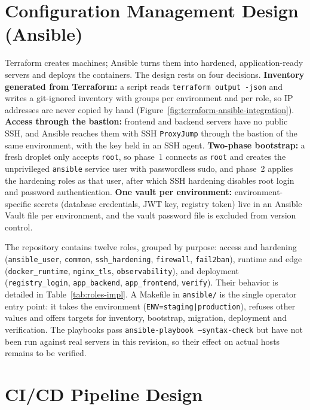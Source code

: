 \section{Configuration Management Design (Ansible)}

Terraform creates machines; Ansible turns them into hardened, application-ready servers and deploys the containers. The design rests on four decisions. \textbf{Inventory generated from Terraform:} a script reads \texttt{terraform output -json} and writes a git-ignored inventory with groups per environment and per role, so IP addresses are never copied by hand (Figure~\ref{fig:terraform-ansible-integration}). \textbf{Access through the bastion:} frontend and backend servers have no public SSH, and Ansible reaches them with SSH \texttt{ProxyJump} through the bastion of the same environment, with the key held in an SSH agent. \textbf{Two-phase bootstrap:} a fresh droplet only accepts \texttt{root}, so phase~1 connects as \texttt{root} and creates the unprivileged \texttt{ansible} service user with passwordless sudo, and phase~2 applies the hardening roles as that user, after which SSH hardening disables root login and password authentication. \textbf{One vault per environment:} environment-specific secrets (database credentials, JWT key, registry token) live in an Ansible Vault file per environment, and the vault password file is excluded from version control.



The repository contains twelve roles, grouped by purpose: access and hardening (\texttt{ansible\_user}, \texttt{common}, \texttt{ssh\_hardening}, \texttt{firewall}, \texttt{fail2ban}), runtime and edge (\texttt{docker\_runtime}, \texttt{nginx\_tls}, \texttt{observability}), and deployment (\texttt{registry\_login}, \texttt{app\_backend}, \texttt{app\_frontend}, \texttt{verify}). Their behavior is detailed in Table~\ref{tab:roles-impl}. A Makefile in \texttt{ansible/} is the single operator entry point: it takes the environment (\texttt{ENV=staging|production}), refuses other values and offers targets for inventory, bootstrap, migration, deployment and verification. The playbooks pass \texttt{ansible-playbook --syntax-check} but have not been run against real servers in this revision, so their effect on actual hosts remains to be verified.

\section{CI/CD Pipeline Design}
\label{sec:pipeline}

